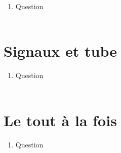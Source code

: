 \documentclass{article}
\begin{document}
\begin{enumerate}
		$pthread\_mutex\_lock (\&mutex);$ \\
		$pthread\_mutex\_unlock (\&mutex);$ \\
		Puis compiler et exécuter le code pour voir si le soucis de compteur est réglé ou pas
		(vérifiez sur plusieurs exécutions). Vérifiez déjà sur plusieurs exécutions du programme
		que le soucis est réglé, puis pour vérifier d’une autre façon, commentez la partie qui fait
		dormir les processus et passez à 10 000 processus. Est-ce ok au bout de 10 essais à 10
		000 processus ? \\
			\textcolor{blue}{C'est ok!}\\
		\item Question \\
			\textcolor{blue}{}\\
	\end{enumerate}
	\section{Signaux et tube}
	\begin{enumerate}
		\item Question \\
			\textcolor{blue}{}\\
	\end{enumerate}
	\section{Le tout à la fois}
	\begin{enumerate}
		\item Question \\
			\textcolor{blue}{}\\
	\end{enumerate}
		
	
\end{document}
